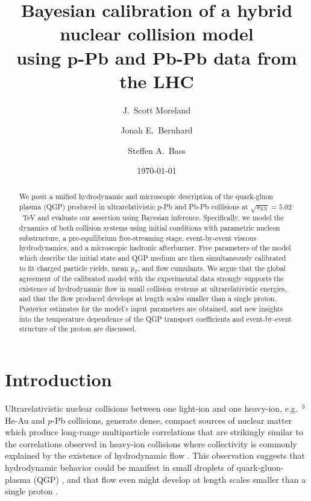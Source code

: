 \documentclass[aps,prc,reprint,amsmath,nofootinbib]{revtex4-1}
\newcommand{\sqrts}{\sqrt{s_\mathrm{NN}}}
\begin{document}
\title{
  Bayesian calibration of a hybrid nuclear collision model\\
  using $\boldsymbol p$-Pb and Pb-Pb data from the LHC
}

\author{J.\ Scott Moreland}
\author{Jonah E.\ Bernhard}
\author{Steffen A.\ Bass}


\date{\today}

\begin{abstract}
We posit a unified hydrodynamic and microscopic description of the quark-gluon plasma (QGP) produced in ultrarelativistic $p$-Pb and Pb-Pb collisions at $\sqrts=5.02$~TeV and evaluate our assertion using Bayesian inference. Specifically, we model the dynamics of both collision systems using initial conditions with parametric nucleon substructure, a pre-equilibrium free-streaming stage, event-by-event viscous hydrodynamics, and a microscopic hadronic afterburner.
Free parameters of the model which describe the initial state and QGP medium are then simultaneously calibrated to fit charged particle yields, mean $p_T$, and flow cumulants.
We argue that the global agreement of the calibrated model with the experimental data strongly supports the existence of hydrodynamic flow in small collision systems at ultrarelativistic energies, and that the flow produced develops at length scales smaller than a single proton.
Posterior estimates for the model's input parameters are obtained, and new insights into the temperature dependence of the QGP transport coefficients and event-by-event structure of the proton are discussed.
\end{abstract}

\maketitle


\section{Introduction}

Ultrarelativistic nuclear collisions between one light-ion and one heavy-ion, e.g.\ $^3$He-Au and $p$-Pb collisions, generate dense, compact sources of nuclear matter which produce long-range multiparticle correlations that are strikingly similar to the correlations observed in heavy-ion collisions where collectivity is commonly explained by the existence of hydrodynamic flow \cite{CMS:2012qk, Abelev:2012ola, Aad:2012gla, Adare:2015ctn}.
This observation suggests that hydrodynamic behavior could be manifest in small droplets of quark-gluon-plasma (QGP) \cite{Bozek:2011if, Bozek:2013uha}, and that flow even might develop at length scales smaller than a single proton \cite{Schenke:2014zha}.
\end{document}
